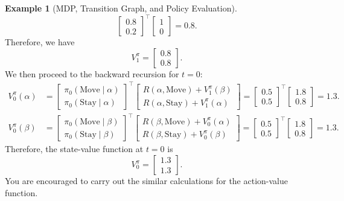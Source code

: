\documentclass[
]{book}
\theoremstyle{definition}
\theoremstyle{definition}
\newtheorem{example}{Example}[chapter]
\theoremstyle{definition}
\theoremstyle{definition}
\theoremstyle{remark}
\begin{document}
\begin{example}[MDP, Transition Graph, and Policy Evaluation]
\begin{equation}
\begin{bmatrix}
0.8 \\ 0.2
\end{bmatrix}^{\top}
\begin{bmatrix}
1 \\ 0
\end{bmatrix} = 0.8.
\end{equation}
Therefore, we have
\[
V^{\pi}_1 = \begin{bmatrix}
0.8 \\ 0.8
\end{bmatrix}.
\]
We then proceed to the backward recursion for \(t=0\):
\begin{align}
V_0^{\pi}(\alpha) & = \begin{bmatrix}
\pi_0(\text{Move} \mid \alpha) \\
\pi_0(\text{Stay} \mid \alpha)
\end{bmatrix}^{\top} \begin{bmatrix}
R(\alpha, \text{Move}) + V^{\pi}_1(\beta) \\
R(\alpha, \text{Stay}) + V^{\pi}_1(\alpha)
\end{bmatrix} = \begin{bmatrix}
0.5 \\ 0.5
\end{bmatrix}^{\top}
\begin{bmatrix}
1.8 \\ 0.8
\end{bmatrix} = 1.3. \\
V_0^{\pi}(\beta) & = \begin{bmatrix}
\pi_0(\text{Move} \mid \beta) \\
\pi_0(\text{Stay} \mid \beta)
\end{bmatrix}^{\top} \begin{bmatrix}
R(\beta, \text{Move}) + V^{\pi}_0(\alpha) \\
R(\beta, \text{Stay}) + V^{\pi}_0(\beta)
\end{bmatrix} = \begin{bmatrix}
0.5 \\ 0.5
\end{bmatrix}^{\top}
\begin{bmatrix}
1.8 \\ 0.8
\end{bmatrix} = 1.3.
\end{align}
Therefore, the state-value function at \(t=0\) is
\[
V^{\pi}_0 = \begin{bmatrix}
1.3 \\ 1.3
\end{bmatrix}.
\]
You are encouraged to carry out the similar calculations for the action-value function.


\end{example}
\end{document}

